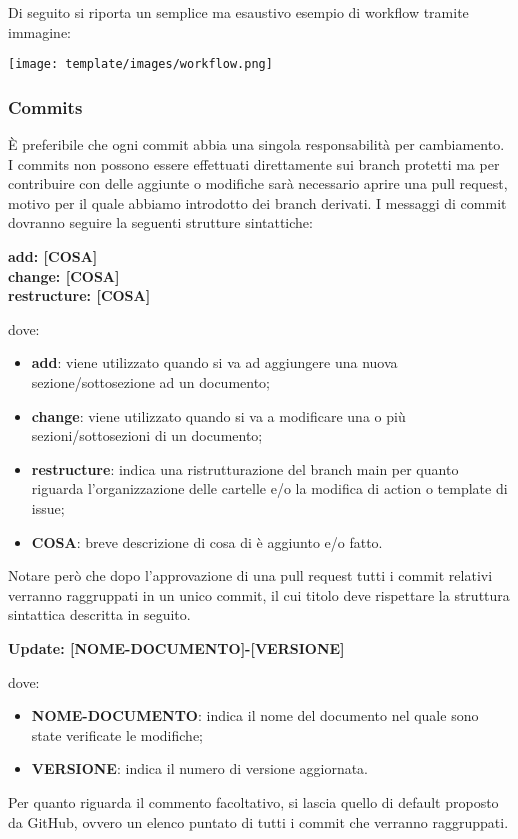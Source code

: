        Di seguito si riporta un semplice ma esaustivo esempio di workflow tramite immagine:
        \begin{center}
            \texttt{[image: template/images/workflow.png]}
        \end{center}

        \subsubsection{Commits}\label{inf:comm}
        È preferibile che ogni commit abbia una singola responsabilità per cambiamento.
        I commits non possono essere effettuati direttamente sui branch protetti ma per contribuire con delle aggiunte o
        modifiche sarà necessario aprire una pull request, motivo per il quale abbiamo introdotto dei branch derivati.
        I messaggi di commit dovranno seguire la seguenti strutture sintattiche:
        \begin{center}
            \textbf{add: [COSA]\\
            change: [COSA]\\
            restructure: [COSA]}
        \end{center}
        dove: 
        \begin{itemize}
            \item \textbf{add}: viene utilizzato quando si va ad aggiungere una nuova sezione/sottosezione ad un documento;
            \item \textbf{change}: viene utilizzato quando si va a modificare una o più sezioni/sottosezioni di un documento;
            \item \textbf{restructure}: indica una ristrutturazione del branch main per quanto riguarda l'organizzazione delle cartelle e/o la modifica di action o template di issue;
            \item \textbf{COSA}: breve descrizione di cosa di è aggiunto e/o fatto.
        \end{itemize}

        Notare però che dopo l'approvazione di una pull request tutti i commit
        relativi verranno raggruppati in un unico commit, il cui titolo deve rispettare la struttura sintattica descritta in
        seguito.
        \begin{center}
            \textbf{Update: [NOME-DOCUMENTO]-[VERSIONE]}
        \end{center}
        dove:

        \begin{itemize}
            \item \textbf{NOME-DOCUMENTO}: indica il nome del documento nel quale sono state verificate le modifiche;
            \item \textbf{VERSIONE}: indica il numero di versione aggiornata.
        \end{itemize}
        Per quanto riguarda il commento facoltativo, si lascia quello di default proposto da GitHub, 
        ovvero un elenco puntato di tutti i commit che verranno raggruppati.\\
        

